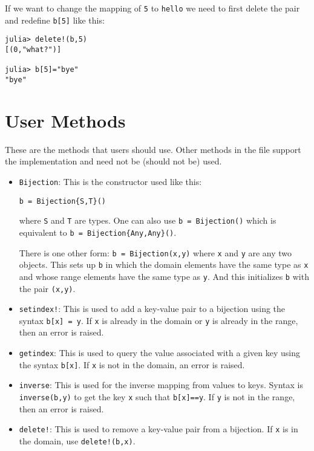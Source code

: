\documentclass[12pt,oneside]{amsart}
\begin{document}
If we want to change the mapping of \verb|5| to \verb|hello| we need
to first delete the pair and redefine \verb|b[5]| like this:
\begin{verbatim}
julia> delete!(b,5)
[(0,"what?")]

julia> b[5]="bye"
"bye"
\end{verbatim}



\section*{User Methods}

These are the methods that users should use. Other methods in the file
support the implementation and need not be (should not be) used.


\begin{itemize}
\item \verb|Bijection|: This is the constructor used like this:
\begin{verbatim}
b = Bijection{S,T}()
\end{verbatim}
where \verb|S| and \verb|T| are types. One can also use 
\verb|b = Bijection()| which is equivalent to
\verb|b = Bijection{Any,Any}()|. 

There is one other form: \verb|b = Bijection(x,y)| where \verb|x| and
\verb|y| are any two objects. This sets up \verb|b| in which the
domain elements have the same type as \verb|x| and whose range
elements have the same type as \verb|y|. And this initializes \verb|b|
with the pair \verb|(x,y)|. 


\item \verb|setindex!|: This is used to add a key-value pair to a
  bijection using the syntax \verb|b[x] = y|. If \verb|x| is already
  in the domain or \verb|y| is already in the range, then an error is
  raised. 

\item \verb|getindex|: This is used to query the value associated with
  a given key using the syntax \verb|b[x]|. If \verb|x| is not in the
  domain, an error is raised.

\item \verb|inverse|: This is used for the inverse mapping from values
  to keys. Syntax is \verb|inverse(b,y)| to get the key \verb|x| such
  that \verb|b[x]==y|.  If \verb|y| is not in the range, then an error
  is raised.

\item \verb|delete!|: This is used to remove a key-value pair from a
  bijection. If \verb|x| is in the domain, use \verb|delete!(b,x)|. 


\end{itemize}
\end{document}
